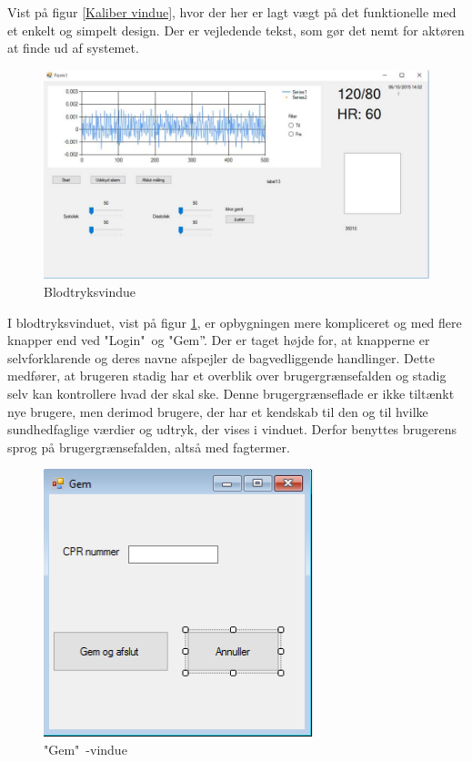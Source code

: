 Vist på figur \ref{Kaliber vindue}, hvor der her er lagt vægt på det funktionelle med et enkelt og simpelt design. Der er vejledende tekst, som gør det nemt for aktøren at finde ud af systemet.

\begin{figure}[H]
	\centering
	\includegraphics[width=1\textwidth]{Figurer/GUI/GUI_form1}
	\caption{Blodtryksvindue}
	\label{Blodtryk vindue}
\end{figure}

I blodtryksvinduet, vist på figur \ref{Blodtryk vindue}, er opbygningen mere kompliceret og med flere knapper end ved "Login"\ og "Gem”\.. Der er taget højde for, at knapperne er selvforklarende og deres navne afspejler de bagvedliggende handlinger. Dette medfører, at brugeren stadig har et overblik over brugergrænsefalden og stadig selv kan kontrollere hvad der skal ske. Denne brugergrænseflade er ikke tiltænkt nye brugere, men derimod brugere, der har et kendskab til den og til hvilke sundhedfaglige værdier og udtryk, der vises i vinduet.  Derfor benyttes brugerens sprog på brugergrænsefalden, altså med fagtermer. 

\begin{figure}[H]
	\centering
	\includegraphics[width=0.7\textwidth]{Figurer/GUI/Gem_GUI}
	\caption{"Gem"\ -vindue}
	\label{Gem vindue}
\end{figure}

